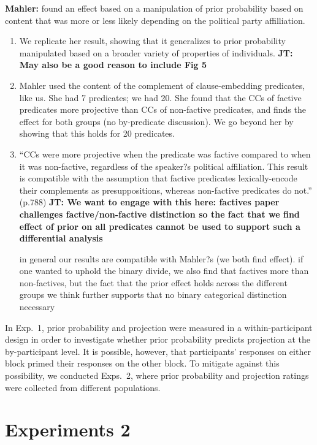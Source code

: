 \documentclass[11pt,fleqn]{article}
\newcommand{\6}{\mbox{$[\hspace*{-.6mm}[$}}
\newcommand{\9}{\mbox{$]\hspace*{-.6mm}]$}}
\newcommand{\jt}[1]{\textbf{\color{blue}JT: #1}}
\begin{document}
{\bf Mahler:} found an effect based on a manipulation of prior probability based on content that was more or less likely depending on the political party affilliation. 

\begin{enumerate}

\item We replicate her result, showing that it generalizes to prior probability manipulated based on a broader variety of properties of individuals. \jt{May also be a good reason to include Fig 5}

\item Mahler used the content of the complement of clause-embedding predicates, like us. She had 7 predicates; we had 20. She found that the CCs of factive predicates more projective than CCs of non-factive predicates, and finds the effect for both groups (no by-predicate discussion). We go beyond her by showing that this holds for 20 predicates.

\item ``CCs were more projective when the predicate was factive compared to when it was non-factive, regardless of the speaker?s political affiliation. This result is compatible with the assumption that factive predicates lexically-encode their complements as presuppositions, whereas non-factive predicates do not.'' (p.788) \jt{We want to engage with this here: factives paper challenges factive/non-factive distinction so the fact that we find effect of prior on all predicates cannot be used to support such a differential analysis}

in general our results are compatible with Mahler?s (we both find effect). if one wanted to uphold the binary divide, we also find that factives more than non-factives, but the fact that the prior effect holds across the different groups we think further supports that no binary categorical distinction necessary

\end{enumerate}

In Exp.~1, prior probability and projection were measured in a within-participant design in order to investigate whether prior probability predicts projection at the by-participant level. It is possible, however, that participants' responses on either block primed their responses on the other block.  To mitigate against this possibility, we conducted Exps.~2, where prior probability and projection ratings were collected from different populations.  

\section{Experiments 2}
\end{document}
